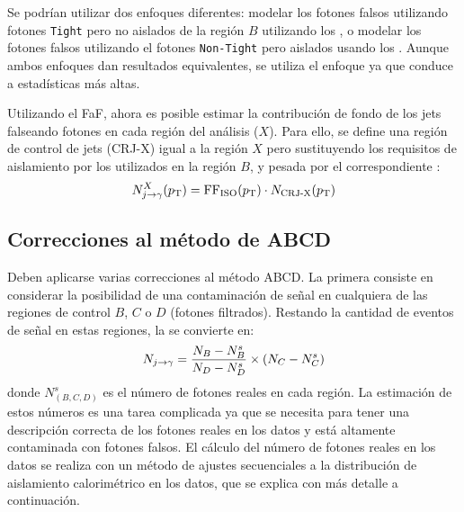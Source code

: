 Se podrían utilizar dos enfoques diferentes: modelar los fotones falsos utilizando fotones \texttt{Tight} pero no aislados de la región \(B\) utilizando los \ffiso, o modelar los fotones falsos utilizando el fotones \texttt{Non-Tight} pero aislados usando los \ffid.
Aunque ambos enfoques dan resultados equivalentes, se utiliza el enfoque \ffiso ya que conduce a estadísticas más altas.


Utilizando el \ac{FaF}, ahora es posible estimar la contribución de fondo de los jets falseando fotones en cada región del análisis (\(X\)). Para ello, se define una región de control de jets (CRJ-X) igual a la región \(X\) pero sustituyendo los requisitos de aislamiento por los utilizados en la región \(B\), y pesada por el correspondiente \ffiso:
\begin{equation*}
    N^{X}_{j\rightarrow\gamma}(p_{\text{T}}) = \text{FF}_{\text{ISO}}(p_{\text{T}})\cdot N_{\text{CRJ-X}}(p_{\text{T}})
\end{equation*}





\subsection{Correcciones al método de ABCD}
\label{subsec:bkg:estimation:abcd_corrections}

Deben aplicarse varias correcciones al método ABCD.
La primera consiste en considerar la posibilidad de una contaminación de señal en cualquiera de las regiones de control \(B\), \(C\) o \(D\) (fotones filtrados). Restando la cantidad de eventos de señal en estas regiones, la \Eqn{\ref{eq:bkg:estimation:abcd:njfakes}} se convierte en:
\begin{equation}
    \label{eq:bkg:estimation:abcd_corrections:njfakes_leak}
    N_{j\rightarrow\gamma} = \frac{N_{B} - N_{B}^{s}}{N_{D} - N_{D}^{s}} \times (N_{C} - N_{C}^{s})
\end{equation}
donde \(N_{(B,C,D)}^{s}\) es el número de fotones reales en cada región. La estimación de estos números es una tarea complicada ya que se necesita para tener una descripción correcta de los fotones reales en los datos y está altamente contaminada con fotones falsos. El cálculo del número de fotones reales en los datos se realiza con un método de ajustes secuenciales a la distribución de aislamiento calorimétrico en los datos, que se explica con más detalle a continuación.


